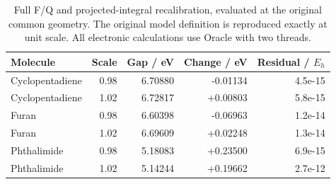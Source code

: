 \begin{table}[!htbp]
\centering\small
\caption{Full F/Q and projected-integral recalibration, evaluated at the original common geometry. The original model definition is reproduced exactly at unit scale. All electronic calculations use Oracle with two threads.}\label{tab:finalanchor}
\begin{tabular}{lrrrr}
\toprule
Molecule & Scale & Gap / eV & Change / eV & Residual / $E_h$ \\
\midrule
Cyclopentadiene & 0.98 & 6.70880 & -0.01134 & 4.5e-15 \\
Cyclopentadiene & 1.02 & 6.72817 & +0.00803 & 5.8e-15 \\
Furan & 0.98 & 6.60398 & -0.06963 & 1.2e-14 \\
Furan & 1.02 & 6.69609 & +0.02248 & 1.3e-14 \\
Phthalimide & 0.98 & 5.18083 & +0.23500 & 6.9e-15 \\
Phthalimide & 1.02 & 5.14244 & +0.19662 & 2.7e-12 \\
\bottomrule
\end{tabular}
\end{table}
